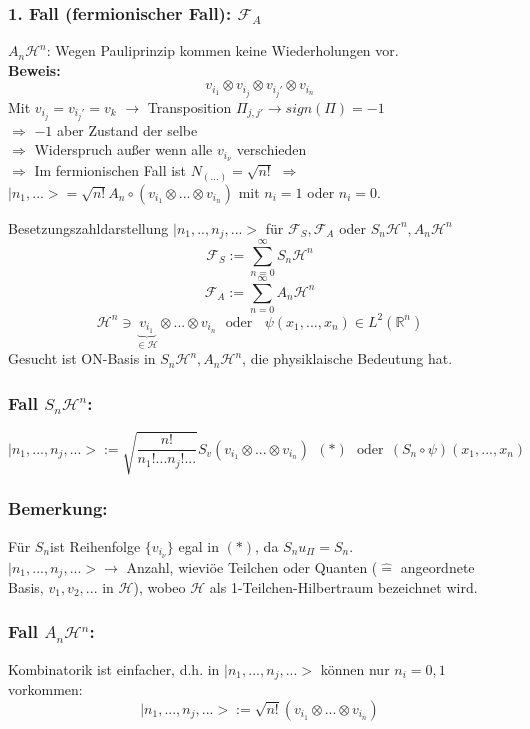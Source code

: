 \documentclass[twoside,a4paper]{scrartcl}
\newcommand{\R}{\mathbb{R}}
\renewcommand{\1}{\mathds{1}}
\newcommand{\Ra}{\Rightarrow}
\newcommand{\ra}{\rightarrow}
\renewcommand{\H}{\mathcal{H}}
\newcommand{\F}{\mathcal{F}}
\renewcommand{\R}{\mathbb{R}}
\begin{document}
\subsubsection*{1. Fall (fermionischer Fall): $\F_A$}
$A_n \H^n$: Wegen Pauliprinzip kommen keine Wiederholungen vor.\\
\textbf{Beweis:}\\
$$v_{i_1}\otimes v_{i_j}\otimes v_{i_j'}\otimes v_{i_n}$$
Mit $v_{i_j}=v_{i_j'}=v_k$ $\ra$ Transposition $\Pi_{j,j'} \ra sign(\Pi)=-1$\\
$\Ra$ $-1$ aber Zustand der selbe\\
$\Ra$ Widerspruch außer wenn alle $v_{i_\nu}$ verschieden\\
$\Ra$ Im fermionischen Fall ist $N_{(...)}=\sqrt{n!}$ $\Ra$ $|n_1,...>=\sqrt{n!}A_n \circ ({v_{i_1}\otimes ... \otimes v_{i_n}})$ mit $n_i=1$ oder $n_i=0$.


Besetzungszahldarstellung $|n_1,..,n_j,...>$ für $\F_S,\F_A$ oder $S_n\H^n, A_n \H^n$\\
$$\F_S:=\sum_{n=0}^\infty S_n \H^n$$
$$\F_A:=\sum_{n=0}^\infty A_n \H^n$$
$$\H^n \ni \underbrace{v_{i_1}}_{\in \H}\otimes ... \otimes v_{i_n} \ \ \ \mathrm{oder}\ \ \ \ \psi(x_1,...,x_n)\in L^2(\R^n)$$
Gesucht ist ON-Basis in $S_n\H^n,A_n\H^n$, die physiklaische Bedeutung hat.
\subsubsection*{Fall $S_n\H^n$:}
$$|n_1,...,n_j,...>:=\sqrt{\frac{n!}{n_1!...n_j!...}}S_v(v_{i_1}\otimes ... \otimes v_{i_n})  \  \ (*) \ \ \ \mathrm{oder} \ \ (S_n \circ \psi)(x_1,...,x_n)$$
\subsubsection*{Bemerkung:}
Für $S_n$ist Reihenfolge $\{v_{i_\nu}\}$ egal in $(*)$, da $S_n u_\Pi=S_n$.\\
$|n_1,...,n_j,...> \ra$ Anzahl, wieviöe Teilchen oder Quanten ($\mathrel{\widehat{=}}$ angeordnete Basis, $v_1,v_2,...$ in $\H$), wobeo $\H$ als 1-Teilchen-Hilbertraum bezeichnet wird.
\subsubsection*{Fall $A_n\H^n$:}
Kombinatorik ist einfacher, d.h. in  $|n_1,...,n_j,...>$ können nur $n_i=0,1$ vorkommen:
$$|n_1,...,n_j,...>:=\sqrt{n!}(v_{i_1}\otimes ... \otimes v_{i_n})$$
\end{document}
